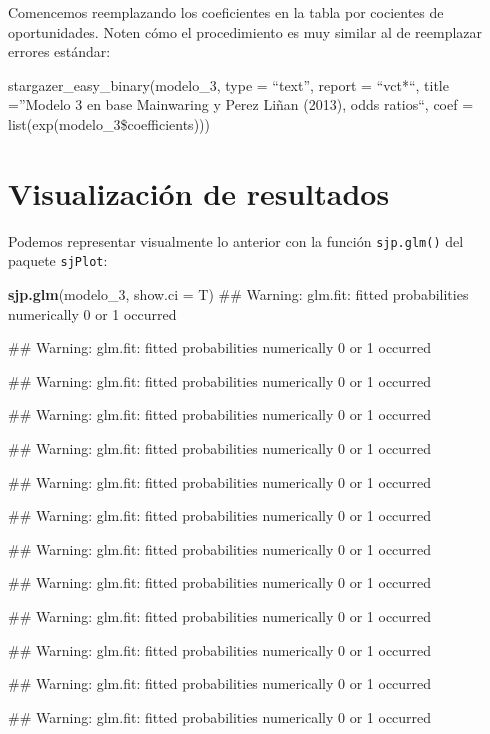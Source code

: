 \documentclass[]{book}
\newenvironment{Shaded}{\begin{snugshade}}{\end{snugshade}}
\newcommand{\KeywordTok}[1]{\textcolor[rgb]{0.13,0.29,0.53}{\textbf{#1}}}
\newcommand{\DataTypeTok}[1]{\textcolor[rgb]{0.13,0.29,0.53}{#1}}
\newcommand{\DecValTok}[1]{\textcolor[rgb]{0.00,0.00,0.81}{#1}}
\newcommand{\NormalTok}[1]{#1}
\begin{document}
Comencemos reemplazando los coeficientes en la tabla por cocientes de
oportunidades. Noten cómo el procedimiento es muy similar al de
reemplazar errores estándar:

stargazer\_easy\_binary(modelo\_3, type = ``text'', report = ``vct*``,
title =''Modelo 3 en base Mainwaring y Perez Liñan (2013), odds
ratios``, coef = list(exp(modelo\_3\$coefficients)))

\section{Visualización de resultados}\label{visualizacion-de-resultados}

Podemos representar visualmente lo anterior con la función
\texttt{sjp.glm()} del paquete \texttt{sjPlot}:

\begin{Shaded}
\begin{Highlighting}[]
\KeywordTok{sjp.glm}\NormalTok{(modelo_}\DecValTok{3}\NormalTok{, }
        \DataTypeTok{show.ci     =}\NormalTok{ T)}
\NormalTok{## Warning: glm.fit: fitted probabilities numerically 0 or 1 occurred}

\NormalTok{## Warning: glm.fit: fitted probabilities numerically 0 or 1 occurred}

\NormalTok{## Warning: glm.fit: fitted probabilities numerically 0 or 1 occurred}

\NormalTok{## Warning: glm.fit: fitted probabilities numerically 0 or 1 occurred}

\NormalTok{## Warning: glm.fit: fitted probabilities numerically 0 or 1 occurred}

\NormalTok{## Warning: glm.fit: fitted probabilities numerically 0 or 1 occurred}

\NormalTok{## Warning: glm.fit: fitted probabilities numerically 0 or 1 occurred}

\NormalTok{## Warning: glm.fit: fitted probabilities numerically 0 or 1 occurred}

\NormalTok{## Warning: glm.fit: fitted probabilities numerically 0 or 1 occurred}

\NormalTok{## Warning: glm.fit: fitted probabilities numerically 0 or 1 occurred}

\NormalTok{## Warning: glm.fit: fitted probabilities numerically 0 or 1 occurred}

\NormalTok{## Warning: glm.fit: fitted probabilities numerically 0 or 1 occurred}

\NormalTok{## Warning: glm.fit: fitted probabilities numerically 0 or 1 occurred}


\end{Highlighting}
\end{Shaded}
\end{document}
